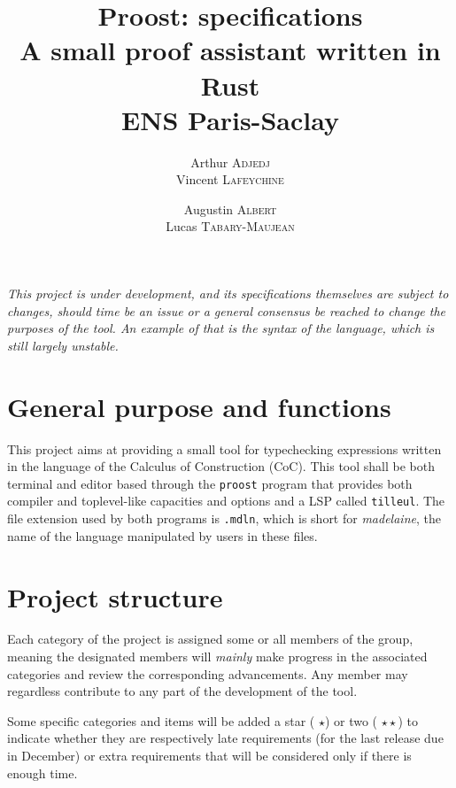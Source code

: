 \documentclass[twocolumn]{article}
\author{
  Arthur \textsc{Adjedj}\\
  Vincent \textsc{Lafeychine} \and
  Augustin \textsc{Albert} \\
  Lucas \textsc{Tabary-Maujean}
}
\title{\textbf{Proost: specifications}\\
  \large A small proof assistant written in Rust
  \\[1\baselineskip]\normalsize ENS Paris-Saclay
}
\newcommand{\etun}{({\color{Green} $\star$}) }
\newcommand{\etde}{({\color{Orange} $\star\star$}) }
\begin{document}
\thispagestyle{fancy}
\maketitle

\emph{
  This project is under development, and its specifications themselves are
  subject to changes, should time be an issue or a general consensus be reached
  to change the purposes of the tool. An example of that is the syntax of
  the language, which is still largely unstable.
}

\section{General purpose and functions}
This project aims at providing a small tool for typechecking expressions written in
the language of the Calculus of Construction (CoC). This tool shall be
both terminal and editor based through the \texttt{proost} program that provides both compiler and toplevel-like capacities and options and a LSP called \texttt{tilleul}.
The file extension used by both programs is \texttt{.mdln}, which is short for \emph{madelaine}, the name of the language manipulated by users in these files.


\section{Project structure}
Each category of the project is assigned some or all members of the group,
meaning the designated members will \emph{mainly} make progress in the associated categories
and review the corresponding advancements. Any member may regardless contribute to any part
of the development of the tool.

Some specific categories and items will be added a star \etun or two \etde to
indicate whether they are respectively late requirements (for the last release
due in December)
or extra requirements that will be considered only if there is enough time.
\end{document}
